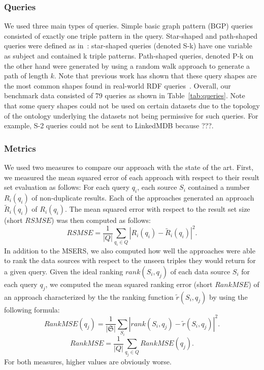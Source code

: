 \documentclass{sig-alternate}  %
\begin{document}
\subsubsection{Queries}
We used three main types of queries. 
Simple basic graph pattern (BGP) queries consisted of exactly one triple pattern in the query.
Star-shaped and path-shaped queries were defined as in~\cite{QTREE}: star-shaped queries (denoted S-k) have one variable as subject and contained k triple patterns. 
Path-shaped queries, denoted P-k on the other hand were generated by using a random walk approach to generate a path of length $k$. 
Note that previous work has shown that these query shapes are the most common shapes found in real-world RDF queries~\cite{DPSBM}.
Overall, our benchmark data consisted of 79 queries as shown in Table~\ref{tab:queries}.
Note that some query shapes could not be used on certain datasets due to the topology of the ontology underlying the datasets not being permissive for such queries. 
For example, S-2 queries could not be sent to LinkedMDB because ???.

\subsubsection{Metrics}
We used two measures to compare our approach with the state of the art.
First, we measured the mean squared error of each approach with respect to their result set evaluation as follows:
For each query $q_i$, each source $S_i$ contained a number $R_i(q_i)$ of non-duplicate results.
Each of the approaches generated an approach $\tilde{R}_i(q_i)$ of $R_i(q_i)$.
The mean squared error with respect to the result set size (short $RSMSE$) was then computed as follows:
\begin{equation}
RSMSE = \frac{1}{|Q|}\sum\limits_{q_i \in Q}|R_i(q_i) - \tilde{R}_i(q_i)|^2.
\end{equation}
In addition to the MSERS, we also computed how well the approaches were able to rank the data sources with respect to the unseen triples they would return for a given query.
Given the ideal ranking $rank(S_i, q_j)$ of each data source $S_i$ for each query $q_j$, we computed the mean squared ranking error (short $RankMSE$) of an approach characterized by the the ranking function $\tilde{r}(S_i, q_j)$ by using the following formula:
\begin{equation}
RankMSE (q_j) = \frac{1}{|\mathfrak{S}|}\sum\limits_{S_i}|rank(S_i, q_j) - \tilde{r}(S_i, q_j)|^2.
\end{equation}
\begin{equation}
RankMSE  = \frac{1}{|Q|}\sum\limits_{q_j  \in Q}RankMSE(q_j).
\end{equation}
For both measures, higher values are obviously worse.
\end{document}
